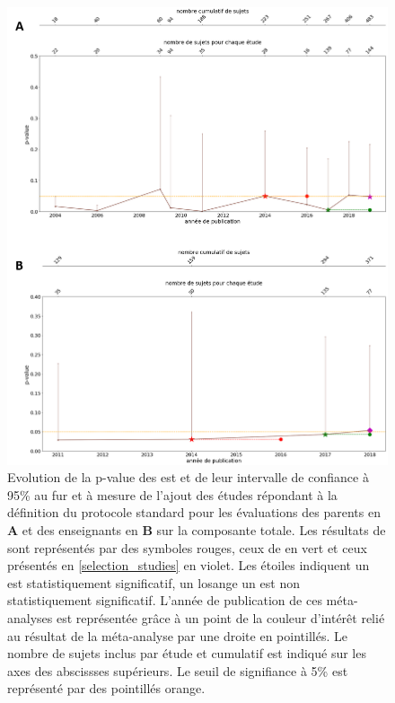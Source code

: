 \begin{figure}[h!]
  \centering
	\includegraphics[width=1\linewidth]{figures/chapter-2/meta-analysis-evolution-pvalue-std} 
  \caption{Evolution de la p-value des \gls{est} et de leur intervalle de confiance à 95\% au fur et à mesure de l'ajout des études répondant à la définition du protocole standard pour les évaluations des 
	parents en \textbf{A} et des enseignants en \textbf{B} sur la composante totale.
  Les résultats de \citep{Cortese2016} sont représentés par des symboles rouges, ceux de \citet{Bussalb2019clinical} en vert et ceux présentés en \ref{selection_studies} en violet. Les étoiles 
	indiquent un \gls{est} statistiquement significatif, un losange un \gls{est} non statistiquement significatif. L'année de publication de ces méta-analyses est représentée grâce à un point de la couleur 
	d'intérêt relié au résultat de la méta-analyse par une droite en pointillés.
	Le nombre de sujets inclus par étude et cumulatif est indiqué sur les axes des abscissses supérieurs.
	Le seuil de signifiance à 5\% est représenté par des pointillés orange.}
  \label{Figure:meta_analysis_evolution_pvalue_std}
\end{figure}

